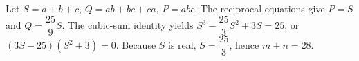 Let $S=a+b+c$, $Q=ab+bc+ca$, $P=abc$. The reciprocal equations give $P=S$ and $Q=\dfrac{25}{9}S$. The cubic-sum identity yields $S^3-\dfrac{25}{3}S^2+3S=25$, or $(3S-25)(S^2+3)=0$. Because $S$ is real, $S=\dfrac{25}{3}$, hence $m+n=\boxed{28}$.
